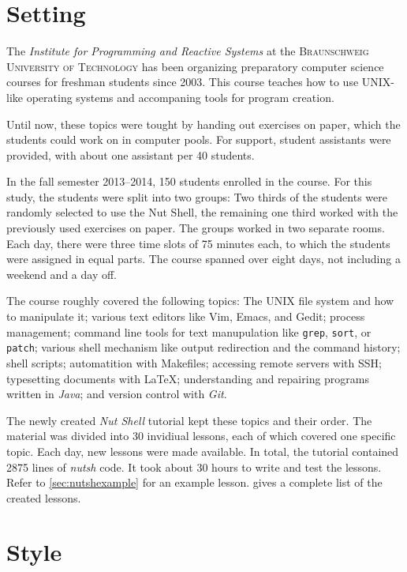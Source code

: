 \documentclass[paper=a4,twoside,abstract=on,cleardoublepage=empty,numbers=noenddot,toc=bib,12pt,appendixprefix=true]{scrreprt}
\begin{document}
\section{Setting}

The \textit{Institute for Programming and Reactive Systems} at the \textsc{Braunschweig University of Technology} has been organizing preparatory computer science courses for freshman students since 2003. This course teaches how to use UNIX-like operating systems and accompaning tools for program creation.

Until now, these topics were tought by handing out exercises on paper, which the students could work on in computer pools. For support, student assistants were provided, with about one assistant per 40 students.

In the fall semester 2013--2014, 150 students enrolled in the course. For this study, the students were split into two groups: Two thirds of the students were randomly selected to use the Nut Shell, the remaining one third worked with the previously used exercises on paper. The groups worked in two separate rooms. Each day, there were three time slots of 75 minutes each, to which the students were assigned in equal parts. The course spanned over eight days, not including a weekend and a day off.

The course roughly covered the following topics: The \textsc{UNIX} file system and how to manipulate it; various text editors like Vim, Emacs, and Gedit; process management; command line tools for text manupulation like \texttt{grep}, \texttt{sort}, or \texttt{patch}; various shell mechanism like output redirection and the command history; shell scripts; automatition with Makefiles; accessing remote servers with \textsc{SSH}; typesetting documents with \LaTeX; understanding and repairing programs written in \textit{Java}; and version control with \textit{Git}.

The newly created \textit{Nut Shell} tutorial kept these topics and their order. The material was divided into 30 invidiual lessons, each of which covered one specific topic. Each day, new lessons were made available. In total, the tutorial contained 2875 lines of \textit{nutsh} code. It took about 30 hours to write and test the lessons. Refer to \cref{sec:nutshexample} for an example lesson.  gives a complete list of the created lessons.

\section{Style}
\end{document}
